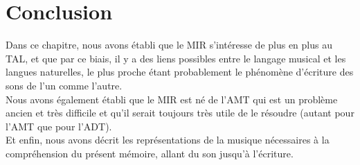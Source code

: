 \section*{Conclusion}
Dans ce chapitre, nous avons établi que le MIR s’intéresse de plus en plus au TAL, et que par ce biais, il y a des liens possibles entre le langage musical et les langues naturelles, le plus proche étant probablement le phénomène d’écriture des sons de l’un comme l’autre.\\
Nous avons également établi que le MIR est né de l’AMT qui est un problème ancien et très difficile et qu’il serait toujours très utile de le résoudre (autant pour l’AMT que pour l’ADT).\\
Et enfin, nous avons décrit les représentations de la musique nécessaires à la compréhension du présent mémoire, allant du son jusqu’à l’écriture.